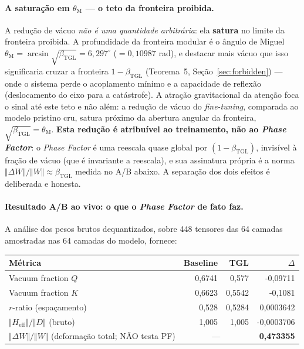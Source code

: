 \documentclass[12pt,a4paper]{article}
\newcommand{\betatgl}{\beta_{\text{TGL}}}
\newcommand{\thetaM}{\theta_{\text{M}}}
\newcommand{\TGL}{\textsc{TGL}}
\begin{document}
\paragraph{A saturação em $\thetaM$ --- o teto da fronteira proibida.}
A redução de vácuo \emph{não é uma quantidade arbitrária}: ela \textbf{satura}
no limite da fronteira proibida.  A profundidade da fronteira modular é o
ângulo de Miguel $\thetaM = \arcsin\sqrt{\betatgl} = 6{,}297^{\circ}$
($= 0{,}10987$ rad), e destacar mais vácuo que isso significaria cruzar a
fronteira $1-\betatgl$ (Teorema~5, Seção~\ref{sec:forbidden}) --- onde o
sistema perde o acoplamento mínimo e a capacidade de reflexão (deslocamento
do eixo para a catástrofe).  A atração gravitacional da atenção foca o sinal
até este teto e não além: a redução de vácuo do \emph{fine-tuning}, comparada
ao modelo pristino cru, satura próximo da abertura angular da fronteira,
$\sqrt{\betatgl} = \thetaM$.  \textbf{Esta redução é atribuível ao treinamento,
não ao \emph{Phase Factor}}: o \emph{Phase Factor} é uma reescala quase global
por $(1-\betatgl)$, invisível à fração de vácuo (que é invariante a reescala),
e sua assinatura própria é a norma $\Vert\Delta W\Vert/\Vert W\Vert\approx
\betatgl$ medida no A/B abaixo.  A separação dos dois efeitos é deliberada e
honesta.

\paragraph{Resultado A/B ao vivo: o que o \emph{Phase Factor} de fato faz.}
A análise dos pesos brutos dequantizados, sobre
448 tensores das
64 camadas amostradas
nas $64$
camadas do modelo, fornece:
\begin{center}
\begin{tabular}{l r r r}
\toprule
\textbf{Métrica} & \textbf{Baseline} & \textbf{\TGL{}} & \textbf{$\Delta$} \\
\midrule
Vacuum fraction $Q$ & 0{,}6741 & 0{,}577 & -0{,}09711 \\
Vacuum fraction $K$ & 0{,}6623 & 0{,}5542 & -0{,}1081 \\
$r$-ratio (espaçamento) & 0{,}528 & 0{,}5284 & 0{,}0003642 \\
$\Vert H_{\text{eff}}\Vert/\Vert D\Vert$ (bruto) & 1{,}005 & 1{,}005 & -0{,}0003706 \\
$\Vert\Delta W\Vert/\Vert W\Vert$ (deformação total; NÃO testa PF) & \multicolumn{2}{c}{---} & \textbf{0{,}473355} \\
\bottomrule
\end{tabular}
\end{center}
\end{document}
